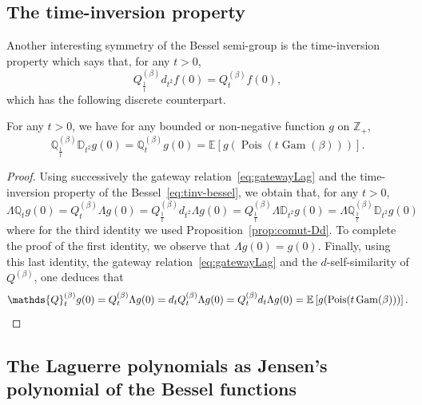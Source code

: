\documentclass[10pt]{amsart}
\theoremstyle{definition}\newtheorem{defi}[theo]{Definition}\newtheorem{rema}[theo]{Remark}\newtheorem{exam}[theo]{Example}\newtheorem{exem}[theo]{Example}\newtheorem{nota}[theo]{Notation}
\DeclareMathOperator{\Pois}{Pois}
\DeclareMathOperator{\Gam}{Gam}
\newcommand{\ZZ}{\mathbb{Z}}
\newcommand*\E{{\mathbb E}}
\newcommand{\discret}[1]{\mathds{#1}}
\newcommand{\cont}[1]{{#1}}
\begin{document}
\subsection{The time-inversion property} Another interesting symmetry of the Bessel semi-group is the time-inversion property which says that, for any $t>0$,
\begin{equation}\label{eq:tinv-bessel}
\cont{Q}^{(\beta)}_{\frac{1}{t}}\cont{d}_{t^2}f(0)=\cont{Q}^{(\beta)}_tf(0),
\end{equation}
which has the following discrete counterpart.

\begin{prop}\label{prop:tiv}
For any $t>0$, we have for any bounded or non-negative function $g$ on $\ZZ_+$,
\begin{equation*}
\discret{Q}^{(\beta)}_{\frac{1}{t}}\discret{D}_{t^2}g(0)=\discret{Q}^{(\beta)}_tg(0)=\E[g(\Pois(t\Gam(\beta)))].
\end{equation*}
\end{prop}
\begin{proof}
Using successively the gateway relation~\eqref{eq:gatewayLag} and the time-inversion property of the Bessel~\eqref{eq:tinv-bessel}, we obtain that, for any $t>0$,
\[
\Lambda \discret{Q}_t g(0) =\cont{Q}^{(\beta)}_t \Lambda g(0) =\cont{Q}^{(\beta)}_{\frac{1}{t}}\cont{d}_{t^2}\Lambda g(0)=\cont{Q}^{(\beta)}_{\frac{1}{t}}\Lambda \discret{D}_{t^2}g(0)=\Lambda\discret{Q}^{(\beta)}_{\frac{1}{t}} \discret{D}_{t^2}g(0)
\]
where for the third identity we used Proposition~\ref{prop:comut-Dd}. To complete the proof of the first identity, we observe that $\Lambda g(0)=g(0)$. Finally, using this last identity, the gateway relation~\eqref{eq:gatewayLag} and the $d$-self-similarity of $Q^{(\beta)}$, one deduces that
\[
\discret{Q}^{(\beta)}_tg(0)= Q^{(\beta)}_t \Lambda g(0)= \cont{d}_t Q^{(\beta)}_t \Lambda g(0) = Q^{(\beta)}_t \cont{d}_t\Lambda g(0) =\E\left[g(\Pois(t\Gam(\beta)))\right].\qedhere
\]
\end{proof}

\subsection{The Laguerre polynomials as Jensen's polynomial of the Bessel functions}
\end{document}
